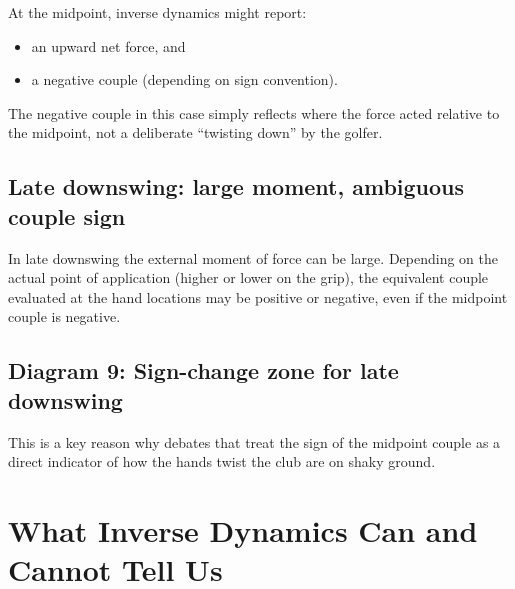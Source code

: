 \documentclass[12pt]{article}
\begin{document}
At the midpoint, inverse dynamics might report:
\begin{itemize}
    \item an upward net force, and
    \item a negative couple (depending on sign convention).
\end{itemize}
The negative couple in this case simply reflects where the force acted relative to the midpoint, not a deliberate ``twisting down'' by the golfer.

\subsection{Late downswing: large moment, ambiguous couple sign}

In late downswing the external moment of force can be large.  
Depending on the actual point of application (higher or lower on the grip), the equivalent couple evaluated at the hand locations may be positive or negative, even if the midpoint couple is negative.

\subsection*{Diagram 9: Sign-change zone for late downswing}

\begin{center}
\end{center}

This is a key reason why debates that treat the sign of the midpoint couple as a direct indicator of how the hands twist the club are on shaky ground.

\section{What Inverse Dynamics Can and Cannot Tell Us}
\end{document}
